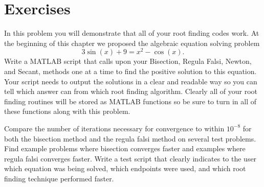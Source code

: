 \newpage\section{Exercises}



\begin{problem}
    In this problem you will demonstrate that all of your root finding codes work.
    At the beginning of this chapter we proposed the algebraic equation solving problem
    \[ 3\sin(x) + 9 = x^2 - \cos(x). \]
    Write a MATLAB script that calls upon your Bisection, Regula Falsi, Newton, and
    Secant, methods one at a time to find the positive solution to this equation.  Your
    script needs to output the solutions in a clear and readable way so you can tell which
    answer can from which root finding algorithm. Clearly all of your root finding
    routines will be stored as MATLAB functions so be sure to turn in all of these
    functions along with this problem.
\end{problem}



\begin{problem}
    Compare the number of iterations necessary for convergence to within $10^{-8}$ for
    both the bisection method and the regula falsi method on several test problems. Find
    example problems where bisection converges faster and examples where regula falsi
    converges faster. Write a test script that clearly indicates to the user which
    equation was being solved, which endpoints were used, and which root finding technique
    performed faster.
\end{problem}


